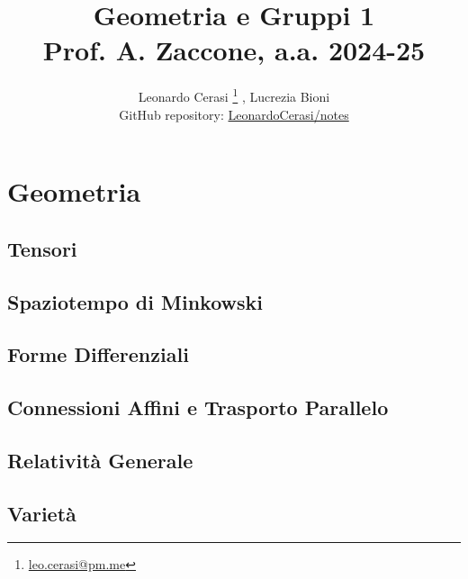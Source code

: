 \documentclass[a4paper, 12pt, openany]{book}
\author{Leonardo Cerasi%
	\thanks{\scriptsize\href{mailto:leonardo.cerasi@studenti.unimi.it}{leo.cerasi@pm.me}}%
	, Lucrezia Bioni\\
	\small GitHub repository: \href{https://github.com/LeonardoCerasi/notes}{LeonardoCerasi/notes}}
\title{\Huge\textbf{Geometria e Gruppi 1} \\ \large Prof. A. Zaccone, a.a. 2024-25}
\begin{document}
\frontmatter

\maketitle

\tableofcontents
\pagestyle{indice}

\mainmatter

\part{Geometria}
\pagestyle{body}

\chapter{Tensori}


\chapter{Spaziotempo di Minkowski}


\chapter{Forme Differenziali}


\chapter{Connessioni Affini e Trasporto Parallelo}


\chapter{Relatività Generale}


\chapter{Varietà}

\end{document}
